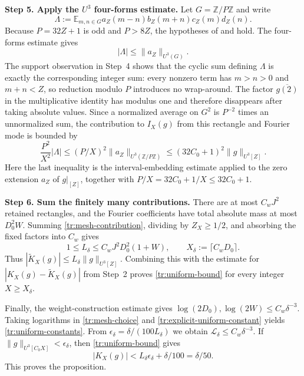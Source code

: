 \documentclass[twoside]{aomart}
\makeatletter
\theoremstyle{paperplain}
\theoremstyle{paperdefinition}
\renewenvironment{proof}[1][\proofname]{\par\pushQED{\qed}%
  \normalfont\topsep6\p@\@plus3\p@\relax\trivlist
  \item[\hskip\labelsep\itshape #1\@addpunct{.}]\ignorespaces
}{\popQED\endtrivlist\@endpefalse}
\numberwithin{equation}{section}
\makeatother
\begin{document}
\begin{proof}
\par
\medskip
\noindent\textbf{Step 5. Apply the $U^3$ four-forms estimate.}
Let $G=\mathbb Z/P\mathbb Z$ and write
\[
 \Lambda:=\mathbb E_{m,n\in G}
       a_Z(m-n)b_Z(m+n)c_Z(m)d_Z(n).
\]
Because $P=32Z+1$ is odd and $P>8Z$, the hypotheses of
 and  hold.  The
four-forms estimate gives
\[
 |\Lambda|\le\|a_Z\|_{U^3(G)}.
\]
The support observation in Step~4 shows that the cyclic sum defining
$\Lambda$ is exactly the corresponding integer sum: every nonzero term
has $m>n>0$ and $m+n<Z$, so reduction modulo $P$ introduces no wrap-around.
The factor $\overline{g(2)}$ in the multiplicative identity has modulus one
and therefore disappears after taking absolute values.  Since a normalized
average on $G^2$ is $P^{-2}$ times an unnormalized sum, the contribution to
$I_X(g)$ from this rectangle and Fourier mode is bounded by
\begin{equation}
 \frac{P^2}{X^2}|\Lambda|
 \le (P/X)^2\|a_Z\|_{U^3(\mathbb Z/P\mathbb Z)}
 \le(32C_0+1)^2\|g\|_{U^3[Z]}.
 \label{tr:mesh-contribution}
\end{equation}
Here the last inequality is the interval-embedding estimate applied to the
zero extension $a_Z$ of $g|_{[Z]}$, together with
$P/X=32C_0+1/X\le32C_0+1$.

\par
\medskip
\noindent\textbf{Step 6. Sum the finitely many contributions.}
There are at most $C_wJ^2$ retained rectangles, and the Fourier coefficients
have total absolute mass at most $D_0^2W$.  Summing
\eqref{tr:mesh-contribution}, dividing by $Z_X\ge1/2$, and absorbing the
fixed factors into $C_w$ gives
\begin{equation}
 1\le L_\delta\le C_wJ^2D_0^2(1+W),
 \qquad X_\delta:=\lceil C_wD_0\rceil.
 \label{tr:explicit-uniform-constant}
\end{equation}
Thus $|\widetilde K_X(g)|\le L_\delta\|g\|_{U^3[Z]}$.  Combining this
with the estimate for $|K_X(g)-\widetilde K_X(g)|$ from Step~2 proves
\eqref{tr:uniform-bound} for every integer $X\ge X_\delta$.

Finally, the weight-construction estimate  gives
$\log(2D_0),\log(2W)\le C_w\delta^{-3}$.  Taking logarithms in
\eqref{tr:mesh-choice} and \eqref{tr:explicit-uniform-constant} yields
\eqref{tr:uniform-constants}.  From
$\epsilon_\delta=\delta/(100L_\delta)$ we obtain
$\mathcal L_\delta\le C_w\delta^{-3}$.  If
$\|g\|_{U^3[C_0X]}<\epsilon_\delta$, then
\eqref{tr:uniform-bound} gives
\[
 |K_X(g)|<L_\delta\epsilon_\delta+\delta/100
 =\delta/50.
\]
This proves the proposition.
\end{proof}
\end{document}
